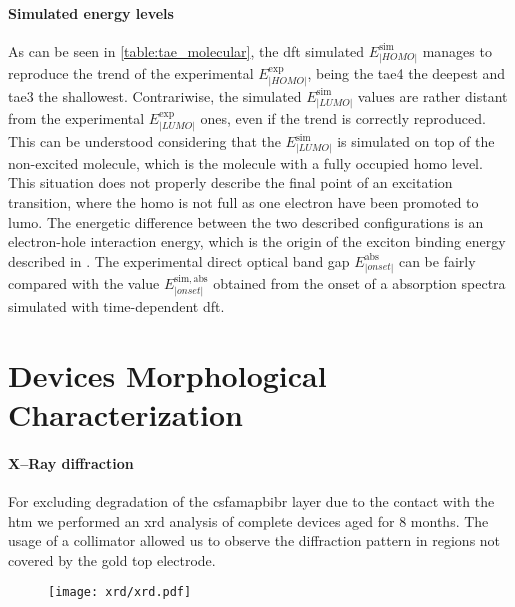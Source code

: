 \paragraph{Simulated energy levels}
As can be seen in \cref{table:tae_molecular}, the \gls{dft} simulated $E^{\mathrm{sim}}_|HOMO|$ manages to reproduce the trend of the experimental $E^{\mathrm{exp}}_|HOMO|$, being the \gls{tae4} the deepest and \gls{tae3} the shallowest.
Contrariwise, the simulated $E^{\mathrm{sim}}_|LUMO|$ values are rather distant from the experimental $E^{\mathrm{exp}}_|LUMO|$ ones, even if the trend is correctly reproduced.
This can be understood considering that the $E^{\mathrm{sim}}_|LUMO|$ is simulated on top of the non\hyp{}excited molecule, which is the molecule with a fully occupied \gls{homo} level.
This situation does not properly describe the final point of an excitation transition, where the \gls{homo} is not full as one electron have been promoted to \gls{lumo}.
The energetic difference between the two described configurations is an electron\hyp{}hole interaction energy, which is the origin of the exciton binding energy described in .
The experimental direct optical band gap \small$E^{\mathrm{abs}}_|onset|$ can be fairly compared with the value $E^{\mathrm{sim,abs}}_|onset|$ obtained from the onset of a absorption spectra simulated with time\hyp{}dependent \gls{dft}.



\section{Devices Morphological Characterization}

\paragraph{X--Ray diffraction}

For excluding degradation of the \gls{csfamapbibr} layer due to the contact with the \gls{htm} we performed an \gls{xrd} analysis of complete devices aged for 8 months.
The usage of a collimator allowed us to observe the diffraction pattern in regions not covered by the gold top electrode.


\begin{figure}
			\centering
				\texttt{[image: xrd/xrd.pdf]}
			\label{fig:tae_xrd}
\end{figure}


